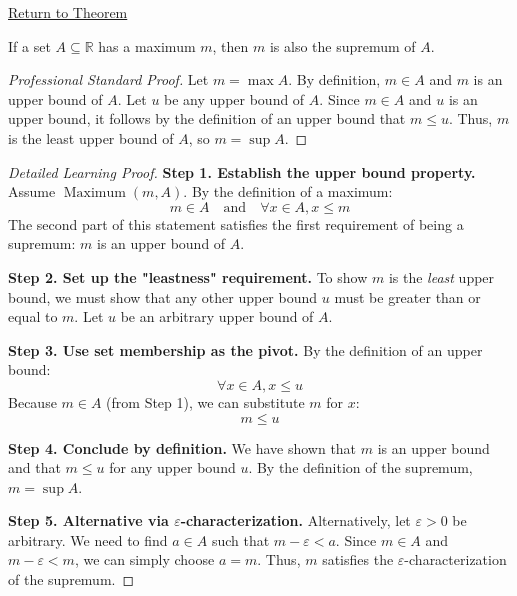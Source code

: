 \newpage
{}
\label{prf:maximum-implies-supremum}

\begin{remark*}[Return]
\hyperref[prop:maximum-implies-supremum]{Return to Theorem}
\end{remark*}

\begin{proposition*}
If a set $A \subseteq \mathbb{R}$ has a maximum $m$, then $m$ is also the supremum of $A$.
\end{proposition*}

\begin{proof}[Professional Standard Proof]
\LRAProofBodyStart
Let $m = \max A$. By definition, $m \in A$ and $m$ is an upper bound of $A$. Let $u$ be any upper bound of $A$. Since $m \in A$ and $u$ is an upper bound, it follows by the definition of an upper bound that $m \le u$. Thus, $m$ is the least upper bound of $A$, so $m = \sup A$.
\end{proof}

\begin{proof}[Detailed Learning Proof]
\LRAProofBodyStart

\textbf{Step 1. Establish the upper bound property.}
Assume $\operatorname{Maximum}(m, A)$. By the definition of a maximum:
\[ m \in A \quad \text{and} \quad \forall x \in A, x \le m \]
The second part of this statement satisfies the first requirement of being a supremum: $m$ is an upper bound of $A$.

\textbf{Step 2. Set up the "leastness" requirement.}
To show $m$ is the \textit{least} upper bound, we must show that any other upper bound $u$ must be greater than or equal to $m$. Let $u$ be an arbitrary upper bound of $A$.

\textbf{Step 3. Use set membership as the pivot.}
By the definition of an upper bound:
\[ \forall x \in A, x \le u \]
Because $m \in A$ (from Step 1), we can substitute $m$ for $x$:
\[ m \le u \]

\textbf{Step 4. Conclude by definition.}
We have shown that $m$ is an upper bound and that $m \le u$ for any upper bound $u$. By the definition of the supremum, $m = \sup A$.

\textbf{Step 5. Alternative via $\varepsilon$-characterization.}
Alternatively, let $\varepsilon > 0$ be arbitrary. We need to find $a \in A$ such that $m - \varepsilon < a$. Since $m \in A$ and $m - \varepsilon < m$, we can simply choose $a = m$. Thus, $m$ satisfies the $\varepsilon$-characterization of the supremum.
\end{proof}

